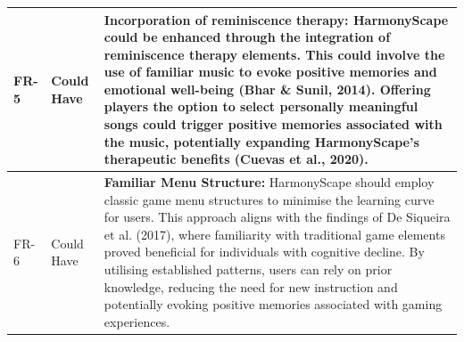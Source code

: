 \documentclass{l4proj}
\begin{document}
\begin{longtable}{|p{1.5cm}|p{1.5cm}|p{10cm}|}
\hline
FR-5 & Could Have & \textbf{Incorporation of reminiscence therapy:} HarmonyScape could be enhanced through the integration of reminiscence therapy elements. This could involve the use of familiar music to evoke positive memories and emotional well-being (Bhar \& Sunil, 2014). Offering players the option to select personally meaningful songs could trigger positive memories associated with the music, potentially expanding HarmonyScape's therapeutic benefits (Cuevas et al., 2020). \\ 
\hline
FR-6 & Could Have & \textbf{Familiar Menu Structure:} HarmonyScape should employ classic game menu structures to minimise the learning curve for users. This approach aligns with the findings of De Siqueira et al. (2017), where familiarity with traditional game elements proved beneficial for individuals with cognitive decline. By utilising established patterns, users can rely on prior knowledge, reducing the need for new instruction and potentially evoking positive memories associated with gaming experiences. \\
\end{longtable}


\end{document}
